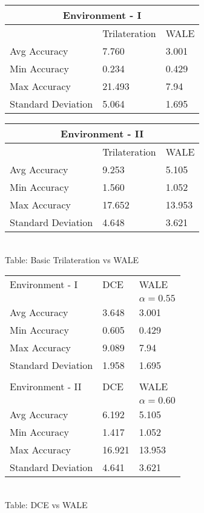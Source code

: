 \documentclass[twocolumn, 11pt]{IEEEtran}
\begin{document}
\begin{tabular}{ |p{3.2cm}|p{2.25cm}|p{1.5cm}|  }
 \hline
 \multicolumn{3}{|c|}{Environment - I} \\
 \hline
  & Trilateration &WALE\\
 \hline
 Avg Accuracy  & 7.760 &  3.001\\
 
 Min Accuracy  & 0.234 &  0.429\\
 Max Accuracy  & 21.493 & 7.94\\
 Standard Deviation& 5.064 & 1.695\\
 \hline
\end{tabular}



\begin{tabular}{ |p{3.2cm}|p{2.25cm}|p{1.5cm}|  }
 \hline
 \multicolumn{3}{|c|}{Environment - II} \\
 \hline
  & Trilateration &WALE\\
 \hline
 Avg Accuracy  & 9.253 &  5.105\\
 Min Accuracy  & 1.560 &  1.052\\
 Max Accuracy  & 17.652 & 13.953\\
 Standard Deviation & 4.648 &  3.621\\
 \hline
\end{tabular}
\\

Table: Basic Trilateration vs WALE
\\

\begin{tabular}{ |p{3.2cm}|p{1cm}|p{2.5cm}|  }
 \hline

 \hline
 Environment - I & DCE &WALE \\
  & &$\alpha = 0.55$ \\
 \hline
 Avg Accuracy  & 3.648   & 3.001 \\
 Min Accuracy  & 0.605   & 0.429 \\
 Max Accuracy  & 9.089   & 7.94  \\
 Standard Deviation & 1.958 &  1.695\\
 \hline
 \multicolumn{3}{c}{} \\
 \hline
 
  \hline
  Environment - II& DCE &WALE \\
   & &$\alpha = 0.60$\\
 \hline
 Avg Accuracy  & 6.192      & 5.105\\
 Min Accuracy  & 1.417      & 1.052\\
 Max Accuracy  & 16.921     &  13.953\\
 Standard Deviation & 4.641 &  3.621\\
 \hline

\end{tabular}
\\

Table: DCE vs WALE







\end{document}
